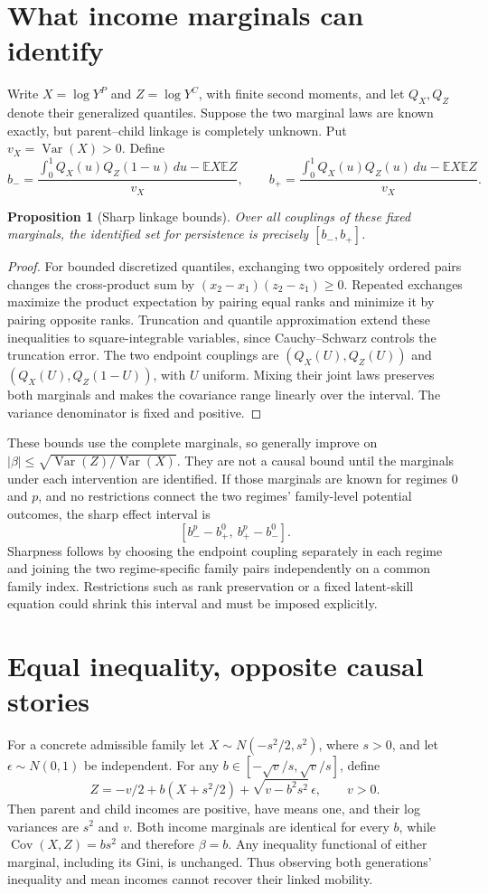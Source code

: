 \documentclass[11pt]{article}
\newtheorem{proposition}{Proposition}
\newcommand{\E}{\mathbb E}
\newcommand{\Var}{\operatorname{Var}}
\newcommand{\Cov}{\operatorname{Cov}}
\begin{document}
\section*{What income marginals can identify}
Write $X=\log Y^P$ and $Z=\log Y^C$, with finite second moments, and let $Q_X,Q_Z$ denote their generalized quantiles. Suppose the two marginal laws are known exactly, but parent--child linkage is completely unknown. Put $v_X=\Var(X)>0$. Define
\[
 b_- =\frac{\int_0^1 Q_X(u)Q_Z(1-u)\,du-\E X\E Z}{v_X},\qquad
 b_+ =\frac{\int_0^1 Q_X(u)Q_Z(u)\,du-\E X\E Z}{v_X}.
\]
\begin{proposition}[Sharp linkage bounds]
Over all couplings of these fixed marginals, the identified set for persistence is precisely $[b_-,b_+]$.
\end{proposition}
\begin{proof}
For bounded discretized quantiles, exchanging two oppositely ordered pairs changes the cross-product sum by $(x_2-x_1)(z_2-z_1)\geq0$. Repeated exchanges maximize the product expectation by pairing equal ranks and minimize it by pairing opposite ranks. Truncation and quantile approximation extend these inequalities to square-integrable variables, since Cauchy--Schwarz controls the truncation error. The two endpoint couplings are $(Q_X(U),Q_Z(U))$ and $(Q_X(U),Q_Z(1-U))$, with $U$ uniform. Mixing their joint laws preserves both marginals and makes the covariance range linearly over the interval. The variance denominator is fixed and positive.
\end{proof}
These bounds use the complete marginals, so generally improve on $|\beta|\leq\sqrt{\Var(Z)/\Var(X)}$. They are not a causal bound until the marginals under each intervention are identified. If those marginals are known for regimes $0$ and $p$, and no restrictions connect the two regimes' family-level potential outcomes, the sharp effect interval is
\[
 [b_-^{p}-b_+^{0},\ b_+^{p}-b_-^{0}].
\]
Sharpness follows by choosing the endpoint coupling separately in each regime and joining the two regime-specific family pairs independently on a common family index. Restrictions such as rank preservation or a fixed latent-skill equation could shrink this interval and must be imposed explicitly.

\section*{Equal inequality, opposite causal stories}
For a concrete admissible family let $X\sim N(-s^2/2,s^2)$, where $s>0$, and let $\epsilon\sim N(0,1)$ be independent. For any $b\in[-\sqrt{v}/s,\sqrt{v}/s]$, define
\[
 Z=-v/2+b(X+s^2/2)+\sqrt{v-b^2s^2}\,\epsilon,
 \qquad v>0.
\]
Then parent and child incomes are positive, have means one, and their log variances are $s^2$ and $v$. Both income marginals are identical for every $b$, while $\Cov(X,Z)=bs^2$ and therefore $\beta=b$. Any inequality functional of either marginal, including its Gini, is unchanged. Thus observing both generations' inequality and mean incomes cannot recover their linked mobility.
\end{document}
